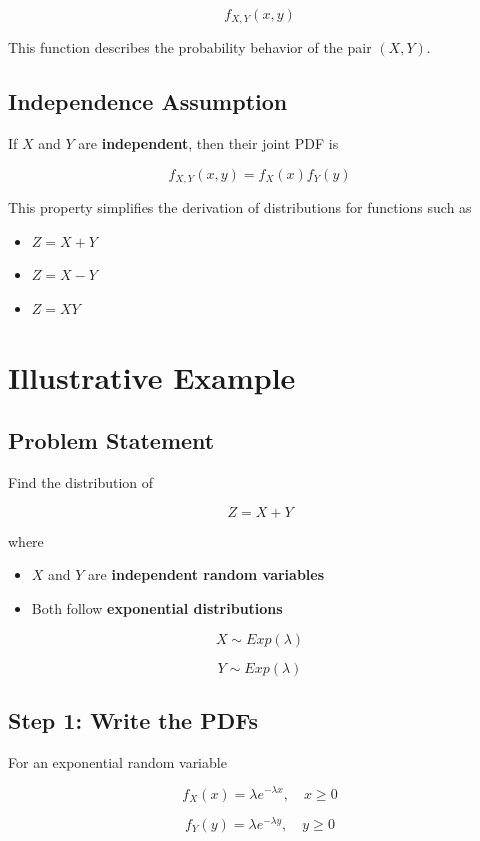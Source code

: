 \documentclass[12pt]{article}
\begin{document}
\[
f_{X,Y}(x,y)
\]

This function describes the probability behavior of the pair $(X,Y)$.

\subsection*{Independence Assumption}

If $X$ and $Y$ are \textbf{independent}, then their joint PDF is

\[
f_{X,Y}(x,y) = f_X(x)f_Y(y)
\]

This property simplifies the derivation of distributions for functions such as

\begin{itemize}
\item $Z = X + Y$
\item $Z = X - Y$
\item $Z = XY$
\end{itemize}

\section{Illustrative Example}

\subsection*{Problem Statement}

Find the distribution of

\[
Z = X + Y
\]

where

\begin{itemize}
\item $X$ and $Y$ are \textbf{independent random variables}
\item Both follow \textbf{exponential distributions}
\end{itemize}

\[
X \sim Exp(\lambda)
\]

\[
Y \sim Exp(\lambda)
\]

\subsection*{Step 1: Write the PDFs}

For an exponential random variable

\[
f_X(x) = \lambda e^{-\lambda x}, \quad x \ge 0
\]

\[
f_Y(y) = \lambda e^{-\lambda y}, \quad y \ge 0
\]
\end{document}
